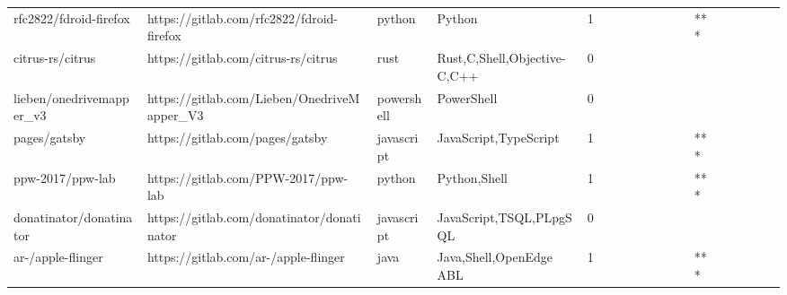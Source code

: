 \begin{tabular}{llllrlllllllllllll}
rfc2822/fdroid-firefox                             &          https://gitlab.com/rfc2822/fdroid-firefox &            python &                                             Python &       1 &         &        &           &                &                 &        &           &       *** &          &          &       &              &          \\
citrus-rs/citrus                                   &                https://gitlab.com/citrus-rs/citrus &              rust &                       Rust,C,Shell,Objective-C,C++ &       0 &         &        &           &                &                 &        &           &           &          &          &       &              &          \\
lieben/onedrivemapper\_v3                           &        https://gitlab.com/Lieben/OnedriveMapper\_V3 &        powershell &                                         PowerShell &       0 &         &        &           &                &                 &        &           &           &          &          &       &              &          \\
pages/gatsby                                       &                    https://gitlab.com/pages/gatsby &        javascript &                              JavaScript,TypeScript &       1 &         &        &           &                &                 &        &           &       *** &          &          &       &              &          \\
ppw-2017/ppw-lab                                   &                https://gitlab.com/PPW-2017/ppw-lab &            python &                                       Python,Shell &       1 &         &        &           &                &                 &        &           &       *** &          &          &       &              &          \\
donatinator/donatinator                            &         https://gitlab.com/donatinator/donatinator &        javascript &                            JavaScript,TSQL,PLpgSQL &       0 &         &        &           &                &                 &        &           &           &          &          &       &              &          \\
ar-/apple-flinger                                  &               https://gitlab.com/ar-/apple-flinger &              java &                            Java,Shell,OpenEdge ABL &       1 &         &        &           &                &                 &        &           &       *** &          &          &       &              &          \\

\end{tabular}
